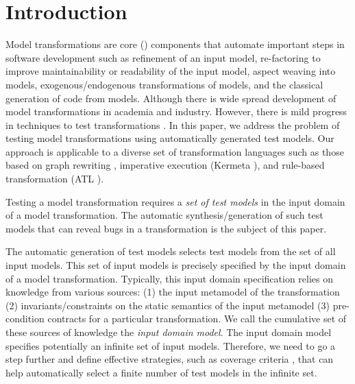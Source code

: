 \section{Introduction}
\label{section:Introduction}

Model transformations are core {\textMDE} ({\MDE}) components that automate important steps in software development such as refinement of an input model, re-factoring to improve maintainability or readability of the input model, aspect weaving into models, exogenous/endogenous transformations of models, and the classical generation of code from models. Although there is wide spread development of model transformations in academia and industry. However, there is mild progress in techniques to test transformations \cite{Baudry09a}. In this paper, we address the problem of testing model transformations using automatically generated  test models. Our approach is applicable to a diverse set of transformation languages such as those based on graph rewriting \cite{bardohl99}, imperative execution (Kermeta \cite{muller2005}), and rule-based transformation (ATL \cite{jouault2006}).

   
 Testing a model transformation requires a \emph{set of test models} in the input domain of a model transformation.   The automatic synthesis/generation of such test models that can reveal bugs in a transformation is the subject of this paper. 
 
 The automatic generation of test models selects test models from the set of all input models. This set of input models is precisely specified by the input domain of a model transformation. Typically, this input domain specification relies on knowledge from various sources: (1) the input metamodel of the transformation (2) invariants/constraints on the static semantics of the input metamodel (3) pre-condition contracts for a particular transformation.  We call the cumulative set of these sources of knowledge the \emph{input domain model}.  The input domain model  specifies potentially an infinite set of  input models. Therefore, we need to go a step further and define effective strategies, such as coverage criteria  \cite{franck2007}, that can help automatically select a finite number of  test models in the infinite set.  

